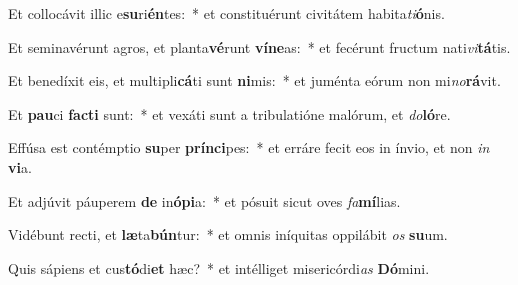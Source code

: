 \item Et collocávit illic e\textbf{su}ri\textbf{én}tes:~* et constituérunt civitátem habita\textit{ti}\textbf{ó}nis.
\item Et seminavérunt agros, et planta\textbf{vé}runt \textbf{ví}\textbf{ne}as:~* et fecérunt fructum nati\textit{vi}\textbf{tá}tis.
\item Et benedíxit eis, et multipli\textbf{cá}ti sunt \textbf{ni}mis:~* et juménta eórum non mi\textit{no}\textbf{rá}vit.
\item Et \textbf{pau}ci \textbf{fac}\textbf{ti} sunt:~* et vexáti sunt a tribulatióne malórum, et \textit{do}\textbf{ló}re.
\item Effúsa est contémptio \textbf{su}per \textbf{prín}\textbf{ci}pes:~* et erráre fecit eos in ínvio, et non \textit{in} \textbf{vi}a.
\item Et adjúvit páuperem \textbf{de} in\textbf{ó}\textbf{pi}a:~* et pósuit sicut oves \textit{fa}\textbf{mí}lias.
\item Vidébunt recti, et \textbf{læ}ta\textbf{bún}tur:~* et omnis iníquitas oppilábit \textit{os} \textbf{su}um.
\item Quis sápiens et cus\textbf{tó}di\textbf{et} hæc?~* et intélliget misericórdi\textit{as} \textbf{Dó}mini.
